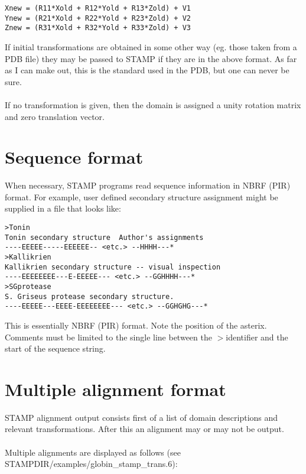 \begin{scriptsize}\begin{verbatim}
Xnew = (R11*Xold + R12*Yold + R13*Zold) + V1
Ynew = (R21*Xold + R22*Yold + R23*Zold) + V2
Znew = (R31*Xold + R32*Yold + R33*Zold) + V3
\end{verbatim} \end{scriptsize}

If initial transformations are obtained in some other way (eg.
those taken from a PDB file) they may be passed to STAMP if they
are in the above format.  As far as I can make out, this is the
standard used in the PDB, but one can never be sure.  \\
\\
If no transformation is given, then the domain is assigned a
unity rotation matrix and zero translation vector.

\section{Sequence format}

When necessary, STAMP programs read sequence information in  NBRF (PIR) 
format.  For example, user defined secondary structure assignment 
might be supplied in a file that looks like:\\

\begin{scriptsize}\begin{verbatim}
>Tonin
Tonin secondary structure  Author's assignments
----EEEEE-----EEEEEE-- <etc.> --HHHH---*
>Kallikrien
Kallikrien secondary structure -- visual inspection
----EEEEEEEE---E-EEEEE--- <etc.> --GGHHHH---*
>SGprotease
S. Griseus protease secondary structure.
----EEEEE---EEEE-EEEEEEEE--- <etc.> --GGHGHG---*
\end{verbatim} \end{scriptsize}

This is essentially NBRF (PIR) format.  Note the position of the asterix.  
Comments must be limited to the single line between the $>$identifier and 
the start of the sequence string.

\section{Multiple alignment format}

STAMP alignment output consists first of a list of domain descriptions and 
relevant transformations.  After this an alignment may or may not
be output. \\
\\
Multiple alignments are displayed as follows (see 
STAMPDIR/examples/globin\_stamp\_trans.6):\\

